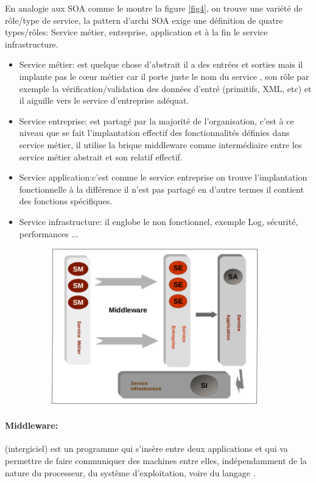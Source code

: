 \documentclass[12pt, a4paper, openany]{report}
\begin{document}
   En analogie aux SOA comme le montre la figure \ref{fig4}, on trouve une variété de rôle/type de service, la pattern d'archi SOA exige une définition de quatre types/rôles: Service métier, entreprise, application et à la fin le service infrastructure.
   \begin{itemize}
      \item  Service métier: est quelque chose d’abstrait il a des entrées et sorties mais il implante pas le cœur métier car il porte juste le nom du service , son rôle par exemple la vérification/validation des données d’entré (primitifs, XML, etc) et il aiguille vers le service d'entreprise adéquat.
      \item  Service entreprise: est partagé par la majorité de l'organisation, c'est à ce niveau que se fait l'implantation effectif des fonctionnalités définies dans service métier, il utilise la brique middleware comme intermédiaire entre les service métier abstrait et son relatif effectif.
      \item  Service application:c'est comme le service entreprise on trouve l'implantation fonctionnelle à la différence il n'est pas partagé en d'autre termes il contient des fonctions spécifiques.
      \item  Service infrastructure: il englobe le non fonctionnel, exemple Log, sécurité, performances ...  
   \end{itemize}
    
   \begin{center}
     \includegraphics[width=13cm, height=6.8cm]{classif_soa_4.png}
     \label{fig4}
   \end{center}
   
   \paragraph{Middleware:} (intergiciel) est un programme qui s'insère entre deux applications et qui va permettre de faire communiquer des machines entre elles, indépendamment de la nature du processeur, du système d'exploitation, voire du langage \cite{refbibMiddle}. \\
   
\end{document}
